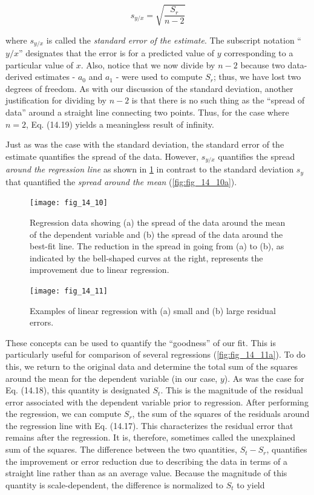 \documentclass[../main.tex]{subfiles}
\begin{document}
\begin{equation}
	\tag{14.19}
	s_{y/x} = \sqrt{\frac{S_r}{n-2}}
\end{equation}

\noindent where $s_{y/x}$ is called the \textit{standard error of the estimate}. The subscript notation ``$y/x$'' designates that the error is for a predicted value of $y$ corresponding to a particular value of $x$.
Also, notice that we now divide by $n - 2$ because two data-derived estimates - $a_0$ and $a_1$ - were used to compute $S_r$; thus, we have lost two degrees of freedom. As with our discussion of the standard deviation, another justification for dividing by $n - 2$ is that there is no such thing as the ``spread of data'' around a straight line connecting two points. Thus, for the case where $n = 2$, Eq. (14.19) yields a meaningless result of infinity.

Just as was the case with the standard deviation, the standard error of the estimate quantifies the spread of the data. However, $s_{y/x}$ quantifies the spread \textit{around the regression line} as shown in \ref{fig:fig_14_10b} in contrast to the standard deviation $s_y$ that quantified the \textit{spread around the mean} (\ref{fig:fig_14_10a}).

\begin{figure}[H]
	\centering
	\texttt{[image: fig\_14\_10]}
	\caption{\textsf{Regression data showing (a) the spread of the data around the mean of the dependent variable and (b) the spread of the data around the best-fit line. The reduction in the spread in going from (a) to (b), as indicated by the bell-shaped curves at the right, represents the improvement due to linear regression.}}
	\label{fig:fig_14_10}
	\label{fig:fig_14_10a}
	\label{fig:fig_14_10b}
\end{figure}

\begin{figure}[H]
	\centering
	\texttt{[image: fig\_14\_11]}
	\caption{\textsf{Examples of linear regression with (a) small and (b) large residual errors.}}
	\label{fig:fig_14_11}
	\label{fig:fig_14_11a}
	\label{fig:fig_14_11b}
\end{figure}

These concepts can be used to quantify the ``goodness'' of our fit. This is particularly useful for comparison of several regressions (\ref{fig:fig_14_11a}). To do this, we return to the original data and determine the total sum of the squares around the mean for the dependent variable (in our case, $y$). As was the case for Eq. (14.18), this quantity is designated $S_t$. This is the magnitude of the residual error associated with the dependent variable prior to regression. After performing the regression, we can compute $S_r$, the sum of the squares of the residuals around the regression line with Eq. (14.17). This characterizes the residual error that remains after the regression. It is, therefore, sometimes called the unexplained sum of the squares. The difference between the two quantities, $S_t - S_r$, quantifies the improvement or error reduction due to describing the data in terms of a straight line rather than as an average value. Because the magnitude of this quantity is scale-dependent, the difference is normalized to $S_t$ to yield
\end{document}
